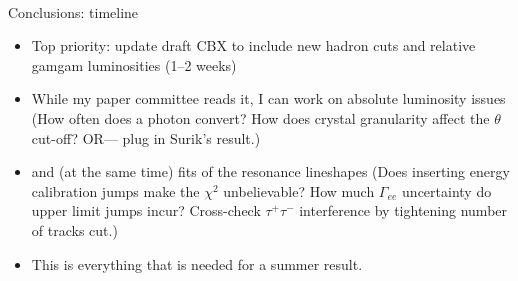 \documentclass[landscape]{article}
\newenvironment{slide}{\mbox{ }\vfill}{\vfill \mbox{ } \pagebreak}
\begin{document}
\begin{slide}
  \vfill
  \begin{center}

    \begin{minipage}{0.85\linewidth} Conclusions: timeline \end{minipage}

    \vfill \begin{minipage}{0.85\linewidth} \begin{itemize}
	\item Top priority: update draft CBX to include new hadron
	cuts and relative gamgam luminosities (1--2 weeks)

	\vspace{0.75 cm}
	\item While my paper committee reads it, I can work on
	absolute luminosity issues (How often does a photon convert?
	How does crystal granularity affect the $\theta$ cut-off?  OR---
	plug in Surik's result.)

	\vspace{0.75 cm}
	\item and (at the same time) fits of the resonance lineshapes
	(Does inserting energy calibration jumps make the $\chi^2$
	unbelievable?  How much $\Gamma_{ee}$ uncertainty do upper
	limit jumps incur?  Cross-check $\tau^+\tau^-$ interference by
	tightening number of tracks cut.)

	\vspace{0.75 cm}
	\item This is everything that is needed for a summer result.

      \end{itemize} \end{minipage}

  \end{center}
  \vfill
\end{slide}
\end{document}
